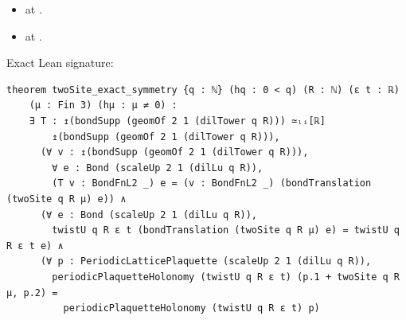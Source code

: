\begin{theorem}[bp-060]
\begin{itemize}
\item \texttt{} at \texttt{}.
\item \texttt{} at \texttt{}.
\end{itemize}
\par Exact Lean signature:
\begin{verbatim}
theorem twoSite_exact_symmetry {q : ℕ} (hq : 0 < q) (R : ℕ) (ε t : ℝ)
    (μ : Fin 3) (hμ : μ ≠ 0) :
    ∃ T : ↥(bondSupp (geomOf 2 1 (dilTower q R))) ≃ₗᵢ[ℝ]
        ↥(bondSupp (geomOf 2 1 (dilTower q R))),
      (∀ v : ↥(bondSupp (geomOf 2 1 (dilTower q R))),
        ∀ e : Bond (scaleUp 2 1 (dilLu q R)),
        (T v : BondFnL2 _) e = (v : BondFnL2 _) (bondTranslation (twoSite q R μ) e)) ∧
      (∀ e : Bond (scaleUp 2 1 (dilLu q R)),
        twistU q R ε t (bondTranslation (twoSite q R μ) e) = twistU q R ε t e) ∧
      (∀ p : PeriodicLatticePlaquette (scaleUp 2 1 (dilLu q R)),
        periodicPlaquetteHolonomy (twistU q R ε t) (p.1 + twoSite q R μ, p.2) =
          periodicPlaquetteHolonomy (twistU q R ε t) p)
\end{verbatim}
\end{theorem}

